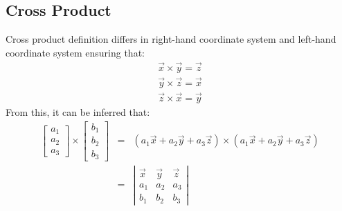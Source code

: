 \documentclass[12pt]{article}
\begin{document}
    \subsection{Cross Product}
    Cross product definition differs in right-hand coordinate system and left-hand
    coordinate system ensuring that:
    \[ \begin{array}{c}
        \overrightarrow{x} \times \overrightarrow{y} = \overrightarrow{z} \\
        \overrightarrow{y} \times \overrightarrow{z} = \overrightarrow{x} \\
        \overrightarrow{z} \times \overrightarrow{x} = \overrightarrow{y}
    \end{array} \]
    From this, it can be inferred that:
    \begin{eqnarray*}
        \left[ \begin{array}{c}
            a_1 \\ a_2 \\ a_3
        \end{array} \right]
        \times
        \left[ \begin{array}{c}
            b_1 \\ b_2 \\ b_3
        \end{array} \right] &
        = &
        \left(
            a_1\overrightarrow{x} + a_2\overrightarrow{y} + a_3\overrightarrow{z}
        \right)
        \times
        \left(
            a_1\overrightarrow{x} + a_2\overrightarrow{y} + a_3\overrightarrow{z}
        \right) \\
        & = &
        \left| \begin{array}{ccc}
            \overrightarrow{x} & \overrightarrow{y} & \overrightarrow{z} \\
            a_1 & a_2 & a_3 \\
            b_1 & b_2 & b_3
        \end{array} \right|
    \end{eqnarray*}
\end{document}
